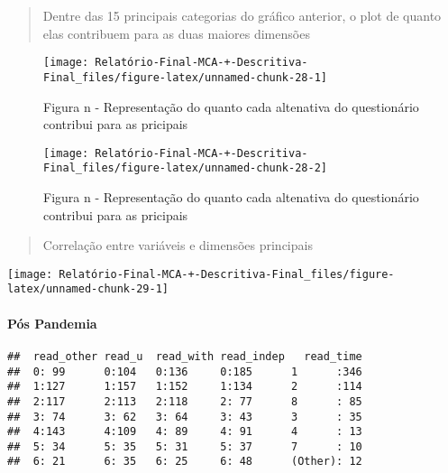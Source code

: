 \documentclass[
]{article}
\begin{document}
\begin{quote}
Dentre das 15 principais categorias do gráfico anterior, o plot de
quanto elas contribuem para as duas maiores dimensões
\end{quote}

\begin{figure}

{\centering \texttt{[image: Relatório-Final-MCA-+-Descritiva-Final\_files/figure-latex/unnamed-chunk-28-1]} 

}

\caption{Figura n - Representação do quanto cada altenativa do questionário contribui para as pricipais}\label{fig:unnamed-chunk-28-1}
\end{figure}
\begin{figure}

{\centering \texttt{[image: Relatório-Final-MCA-+-Descritiva-Final\_files/figure-latex/unnamed-chunk-28-2]} 

}

\caption{Figura n - Representação do quanto cada altenativa do questionário contribui para as pricipais}\label{fig:unnamed-chunk-28-2}
\end{figure}

\begin{quote}
Correlação entre variáveis e dimensões principais
\end{quote}

\begin{center}\texttt{[image: Relatório-Final-MCA-+-Descritiva-Final\_files/figure-latex/unnamed-chunk-29-1]} \end{center}

\hypertarget{puxf3s-pandemia}{%
\paragraph{\texorpdfstring{\textbf{Pós
Pandemia}}{Pós Pandemia}}\label{puxf3s-pandemia}}

\begin{verbatim}
##  read_other read_u  read_with read_indep   read_time  
##  0: 99      0:104   0:136     0:185      1      :346  
##  1:127      1:157   1:152     1:134      2      :114  
##  2:117      2:113   2:118     2: 77      8      : 85  
##  3: 74      3: 62   3: 64     3: 43      3      : 35  
##  4:143      4:109   4: 89     4: 91      4      : 13  
##  5: 34      5: 35   5: 31     5: 37      7      : 10  
##  6: 21      6: 35   6: 25     6: 48      (Other): 12
\end{verbatim}
\end{document}
